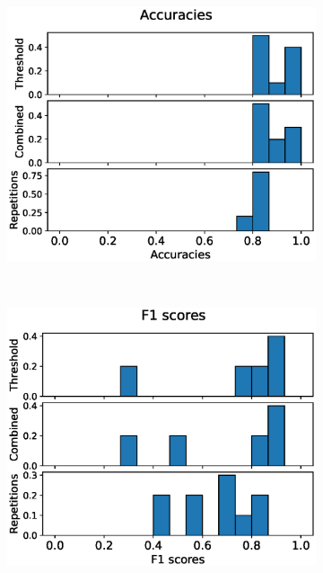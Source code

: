 \begin{figure}
  \centering
  \begin{subfigure}[t]{0.4\textwidth}
    \includegraphics[width=\textwidth]{files/figs/res/kmfp/acc.eps}
    \caption{}
    \label{fig:kmfp-acc}
  \end{subfigure}
  ~
  \begin{subfigure}[t]{0.4\textwidth}
    \includegraphics[width=\textwidth]{files/figs/res/kmfp/f1.eps}
    \caption{}
    \label{fig:kmfp-f1}
  \end{subfigure}


\end{figure}
